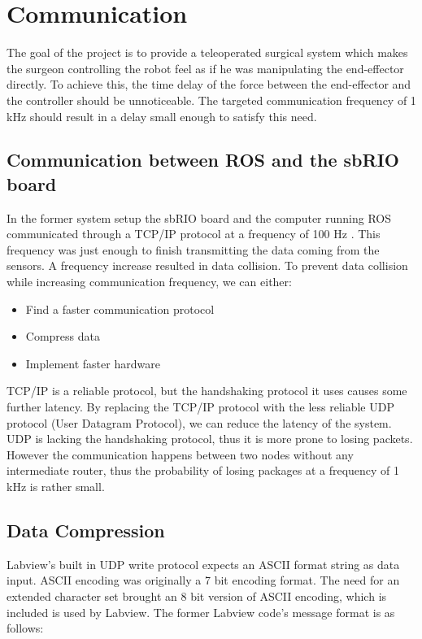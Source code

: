 \chapter{Communication}\label{cha:communication}

The goal of the project is to provide a teleoperated surgical system which makes the surgeon controlling the robot feel as if he was manipulating the end-effector directly. To achieve this, the time delay of the force between the end-effector and the controller should be unnoticeable. The targeted communication frequency of 1 kHz should result in a delay small enough to satisfy this need.

\section{Communication between ROS and the sbRIO board}

In the former system setup the sbRIO board and the computer running ROS communicated through a TCP/IP protocol at a frequency of 100 Hz \cite{System_Overwiew}. This frequency was just enough to finish transmitting the data coming from the sensors. A frequency increase resulted in data collision. To prevent data collision while increasing communication frequency, we can either:

\begin{itemize}
	\item Find a faster communication protocol
	\item Compress data
	\item Implement faster hardware	
\end{itemize}


TCP/IP is a reliable protocol, but the handshaking protocol it uses causes some further latency. By replacing the TCP/IP protocol with the less reliable UDP protocol (User Datagram Protocol), we can reduce the latency of the system. UDP is lacking the handshaking protocol, thus it is more prone to losing packets. However the communication happens between two nodes without any intermediate router, thus the probability of losing packages at a frequency of 1 kHz is rather small.

\section{Data Compression}

Labview's built in UDP write protocol expects an ASCII format string as data input. ASCII encoding was originally a 7 bit encoding format. The need for an extended character set brought an 8 bit version of ASCII encoding, which is included is used by Labview. The former Labview code's message format is as follows:

